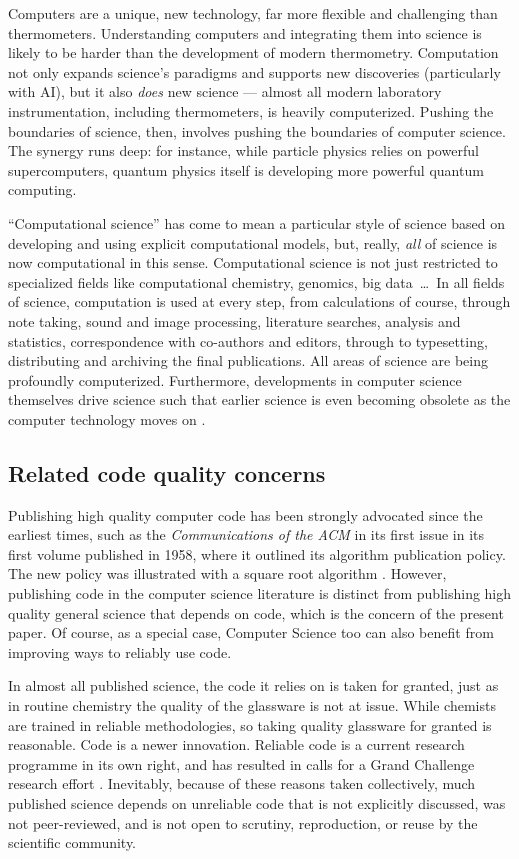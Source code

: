 \documentclass{comjnl}
\begin{document}
Computers are a unique, new technology, far more flexible and challenging than thermometers. Understanding computers and integrating them into science is likely to be harder than the development of modern thermometry. Computation not only expands science's paradigms and supports new discoveries (particularly with AI), but it also \emph{does\/} new science --- almost all modern laboratory instrumentation, including thermometers, is heavily computerized. Pushing the boundaries of science, then, involves pushing the boundaries of computer science. The synergy runs deep: for instance, while particle physics relies on powerful supercomputers, quantum physics itself is developing more powerful quantum computing.

``Computational science'' has come to mean a particular style of science based on developing and using explicit computational models, but, really, \emph{all\/} of science is now computational in this sense. Computational science is not just restricted to specialized fields like computational chemistry, genomics, big data~\ldots\ In all fields of science, computation is used at every step, from calculations of course, through note taking, sound and image processing, literature searches, analysis and statistics, correspondence with co-authors and editors, through to typesetting,  distributing and archiving the final publications. All areas of science are being profoundly computerized. Furthermore, developments in computer science themselves drive science such that earlier science is even becoming obsolete as the computer technology moves on \cite{form}.

\subsection{Related code quality concerns}\label{related-work}
Publishing high quality computer code has been strongly advocated since the earliest times, such as the \emph{Communications of the ACM\/} in its first issue in its first volume published in 1958, where it outlined its algorithm publication policy. The new policy was illustrated with a square root algorithm \cite{acm-algorithms}. However, publishing code in the computer science literature is distinct from publishing high quality general science that depends on code, which is the concern of the present paper. Of course, as a special case, Computer Science too can also benefit from improving ways to reliably use code.

In almost all published science, the code it relies on is taken for granted, just as in routine chemistry the quality of the glassware is not at issue. While chemists are trained in reliable methodologies, so taking quality glassware for granted is reasonable. Code is a newer innovation. Reliable code is a current research programme in its own right, and has resulted in calls for a Grand Challenge research effort \cite{hoare-correctness}. Inevitably, because of these reasons taken collectively, much published science depends on unreliable code that is not explicitly discussed, was not peer-reviewed, and is not open to scrutiny, reproduction, or reuse by the scientific community. 
\end{document}
